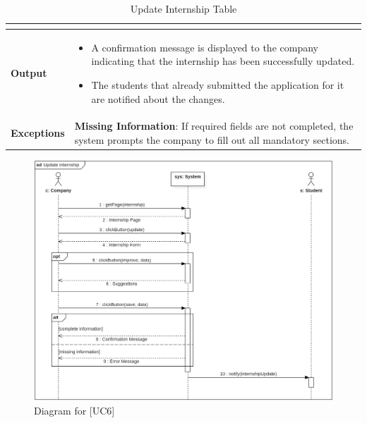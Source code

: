 \begin{table}[H]
\begin{tabular}{|p{4cm}|p{11cm}|}
{\begin{itemize}
    \end{itemize}} \\ \hline
    \textbf{Output} & 
    {\setlength{\leftmargini}{1.1em}
    \begin{itemize}
        \item A confirmation message is displayed to the company indicating that the internship has been successfully updated.
        \item The students that already submitted the application for it are notified about the changes.
    \end{itemize}} \\ \hline
    \textbf{Exceptions} & 
    \textbf{Missing Information}: If required fields are not completed, the system prompts the company to fill out all mandatory sections. \\ \hline
    \end{tabular}
    \caption{Update Internship Table}
\end{table}

\begin{figure} [H]
    \centering
    \includegraphics[width=1\linewidth]{Use Cases Images/update_internship.png}
    \caption{Diagram for [UC6]}
    \label{fig: Update Internship Diagram}
\end{figure}

